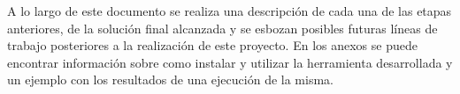 A lo largo de este documento se realiza una descripción de cada una de las etapas anteriores, de la solución final alcanzada y se esbozan posibles futuras líneas de trabajo posteriores a la realización de este proyecto. En los anexos se puede encontrar información sobre como instalar y utilizar la herramienta desarrollada y un ejemplo con los resultados de una ejecución de la misma.
